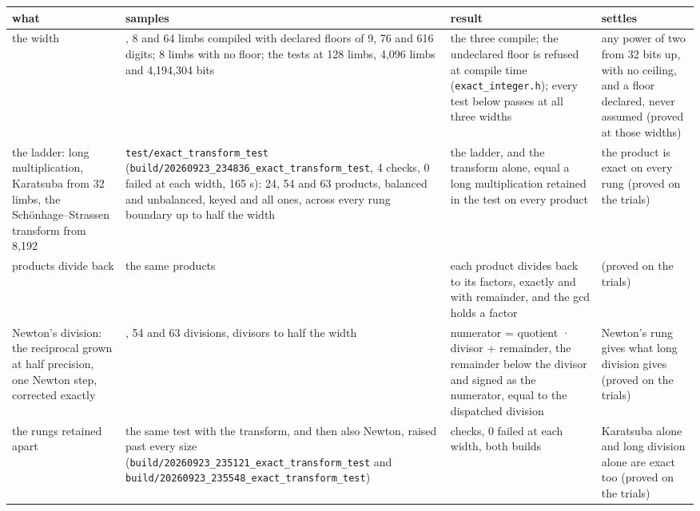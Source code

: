 {\footnotesize
\setlength{\tabcolsep}{6pt}
\begin{longtable}{>{\RaggedRight\arraybackslash}p{}>{\RaggedRight\arraybackslash}p{}>{\RaggedRight\arraybackslash}p{}>{\RaggedRight\arraybackslash}p{}}
\toprule
what & samples & result & settles \\
\midrule
\endhead
the width & 1, 8 and 64 limbs compiled with declared floors of 9, 76 and 616 digits; 8 limbs with no floor; the tests at 128 limbs, 4,096 limbs and 4,194,304 bits & the three compile; the undeclared floor is refused at compile time (\texttt{exact\_\allowbreak{}integer.\allowbreak{}h}); every test below passes at all three widths & any power of two from 32 bits up, with no ceiling, and a floor declared, never assumed (proved at those widths) \\
the ladder: long multiplication, Karatsuba from 32 limbs, the Schönhage–Strassen transform from 8,192 & \texttt{test/\allowbreak{}exact\_\allowbreak{}transform\_\allowbreak{}test} (\texttt{build/\allowbreak{}20260923\_\allowbreak{}234836\_\allowbreak{}exact\_\allowbreak{}transform\_\allowbreak{}test}, 4 checks, 0 failed at each width, 165 s): 24, 54 and 63 products, balanced and unbalanced, keyed and all ones, across every rung boundary up to half the width & the ladder, and the transform alone, equal a long multiplication retained in the test on every product & the product is exact on every rung (proved on the trials) \\
products divide back & the same products & each product divides back to its factors, exactly and with remainder, and the gcd holds a factor & (proved on the trials) \\
Newton's division: the reciprocal grown at half precision, one Newton step, corrected exactly & 24, 54 and 63 divisions, divisors to half the width & numerator = quotient · divisor + remainder, the remainder below the divisor and signed as the numerator, equal to the dispatched division & Newton's rung gives what long division gives (proved on the trials) \\
the rungs retained apart & the same test with the transform, and then also Newton, raised past every size (\texttt{build/\allowbreak{}20260923\_\allowbreak{}235121\_\allowbreak{}exact\_\allowbreak{}transform\_\allowbreak{}test} and \texttt{build/\allowbreak{}20260923\_\allowbreak{}235548\_\allowbreak{}exact\_\allowbreak{}transform\_\allowbreak{}test}) & 4 checks, 0 failed at each width, both builds & Karatsuba alone and long division alone are exact too (proved on the trials) \\

\end{longtable}}
